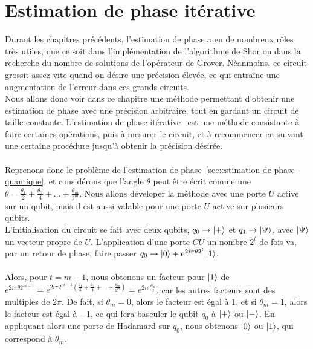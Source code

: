 \chapter{Estimation de phase itérative}\label{ch:iterative-phase-estimatimation}

Durant les chapitres précédents, l'estimation de phase a eu de nombreux rôles très utiles,
que ce soit dans l'implémentation de l'algorithme de Shor ou dans la recherche du nombre
de solutions de l'opérateur de Grover.
Néanmoins, ce circuit grossit assez vite quand on désire une précision élevée, ce qui
entraîne une augmentation de l'erreur dans ces grands circuits.\\
Nous allons donc voir dans ce chapitre une méthode permettant d'obtenir une estimation
de phase avec une précision arbitraire, tout en gardant un circuit de taille constante.
L'estimation de phase itérative~\cite{ipe-article} est une méthode consistante à faire certaines opérations,
puis à mesurer le circuit, et à recommencer en suivant une certaine procédure jusqu'à
obtenir la précision désirée.\\ \\
Reprenons donc le problème de l'estimation de phase~\ref{sec:estimation-de-phase-quantique},
et considérons que l'angle $\theta$ peut être écrit comme une
$\theta = \frac{\theta_1}{2} + \frac{\theta_2}{4} + \dots + \frac{\theta_m}{2^m}$.
Nous allons déveloper la méthode avec une porte $U$ active sur un qubit, mais il est
aussi valable pour une porte $U$ active sur plusieurs qubits.\\
L'initialisation du circuit se fait avec deux qubits, $q_0 \rightarrow \ket{+}$ et
$q_1 \rightarrow \ket{\Psi}$, avec $\ket{\Psi}$ un vecteur propre de $U$.
L'application d'une porte $CU$ un nombre $2^t$ de fois va, par un retour de phase,
faire passer $q_0 \rightarrow \ket{0} + e^{2i\pi\theta2^t}\ket{1}$.\\ \\
Alors, pour $t= m-1$, nous obtenons un facteur pour $\ket{1}$ de $e^{2i\pi\theta2^{m-1}}
= e^{2i\pi 2^{m-1} \left(\frac{\theta_1}{2} + \frac{\theta_2}{4} + \dots + \frac{\theta_m}{2^m}\right)}
= e^{2i\pi \frac{\theta_m}{2}}$, car les autres facteurs sont des multiples de $2\pi$.
De fait, si $\theta_m = 0$, alors le facteur est égal à $1$, et si $\theta_m = 1$, alors
le facteur est égal à $-1$, ce qui fera basculer le qubit $q_0$ à $\ket{+}$ ou $\ket{-}$.
En appliquant alors une porte de Hadamard sur $q_0$, nous obtenons $\ket{0}$ ou $\ket{1}$,
qui correspond à $\theta_m$.\\
